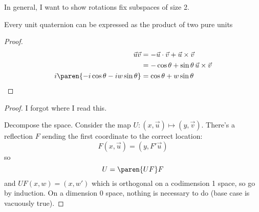 \documentclass[draft]{scrartcl}
\begin{document}
\begin{multicols*}{2}
  In general, I want to show rotations fix subspaces of size 2.

  \begin{theorem}
    Every unit quaternion can be expressed as the product of two pure units
  \end{theorem}
  \begin{proof}
    \begin{align*}
      \vec u \vec v &= -\vec u \cdot \vec v + \vec u \times \vec v \\
                    &= -\cos\theta + \sin\theta \,\vec u\times\vec v \\
      i \paren{-i \cos \theta  - iw\sin\theta} &= \cos\theta + w\sin\theta
    \end{align*}
  \end{proof}

  \begin{theorem}
  \end{theorem}
  \begin{proof}
    I forgot where I read this.

    Decompose the space. Consider the map \(U:(x,\vec u) \mapsto (y,\vec v)\). There's a reflection \(F\) sending the first coordinate to the correct location:
    \[
      F(x,\vec u) = (y, F' \vec u)
    \]
    so
    \[
      U = \paren{UF} F
    \]
    and \(UF(x,w) = (x,w')\) which is orthogonal on a codimension 1 space, so go by induction. On a dimension 0 space, nothing is necessary to do (base case is vacuously true).
  \end{proof}


\end{multicols*}
\end{document}
